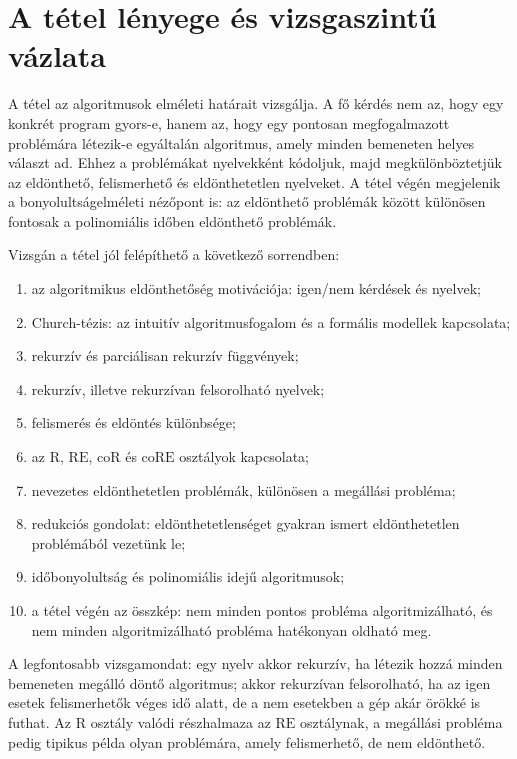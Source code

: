 \section{A tétel lényege és vizsgaszintű vázlata}

\begin{summarybox}
A tétel az algoritmusok elméleti határait vizsgálja. A fő kérdés nem az, hogy egy konkrét program gyors-e, hanem az, hogy egy pontosan megfogalmazott problémára létezik-e egyáltalán algoritmus, amely minden bemeneten helyes választ ad. Ehhez a problémákat nyelvekként kódoljuk, majd megkülönböztetjük az eldönthető, felismerhető és eldönthetetlen nyelveket. A tétel végén megjelenik a bonyolultságelméleti nézőpont is: az eldönthető problémák között különösen fontosak a polinomiális időben eldönthető problémák.
\end{summarybox}

Vizsgán a tétel jól felépíthető a következő sorrendben:

\begin{enumerate}
  \item az algoritmikus eldönthetőség motivációja: igen/nem kérdések és nyelvek;
  \item Church-tézis: az intuitív algoritmusfogalom és a formális modellek kapcsolata;
  \item rekurzív és parciálisan rekurzív függvények;
  \item rekurzív, illetve rekurzívan felsorolható nyelvek;
  \item felismerés és eldöntés különbsége;
  \item az $\mathrm{R}$, $\mathrm{RE}$, $\mathrm{coR}$ és $\mathrm{coRE}$ osztályok kapcsolata;
  \item nevezetes eldönthetetlen problémák, különösen a megállási probléma;
  \item redukciós gondolat: eldönthetetlenséget gyakran ismert eldönthetetlen problémából vezetünk le;
  \item időbonyolultság és polinomiális idejű algoritmusok;
  \item a tétel végén az összkép: nem minden pontos probléma algoritmizálható, és nem minden algoritmizálható probléma hatékonyan oldható meg.
\end{enumerate}

A legfontosabb vizsgamondat: egy nyelv akkor rekurzív, ha létezik hozzá minden bemeneten megálló döntő algoritmus; akkor rekurzívan felsorolható, ha az igen esetek felismerhetők véges idő alatt, de a nem esetekben a gép akár örökké is futhat. Az $\mathrm{R}$ osztály valódi részhalmaza az $\mathrm{RE}$ osztálynak, a megállási probléma pedig tipikus példa olyan problémára, amely felismerhető, de nem eldönthető.

